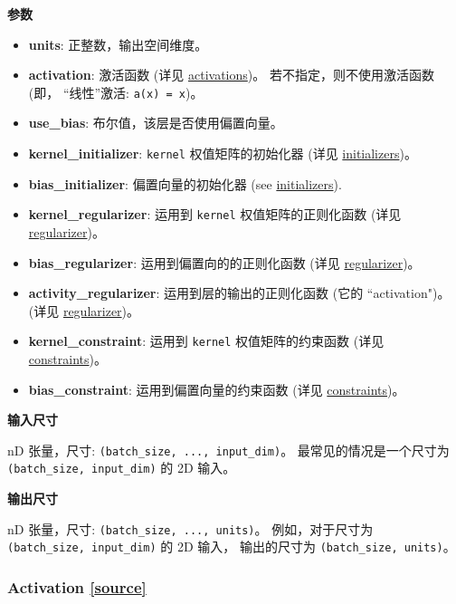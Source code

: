 \textbf{参数}

\begin{itemize}
\tightlist
\item
  \textbf{units}: 正整数，输出空间维度。
\item
  \textbf{activation}: 激活函数 (详见
  \hyperref[activations]{activations})。 若不指定，则不使用激活函数
  (即， ``线性''激活: \texttt{a(x)\ =\ x})。
\item
  \textbf{use\_bias}: 布尔值，该层是否使用偏置向量。
\item
  \textbf{kernel\_initializer}: \texttt{kernel} 权值矩阵的初始化器 (详见
  \hyperref[initializers]{initializers})。
\item
  \textbf{bias\_initializer}: 偏置向量的初始化器 (see
   \hyperref[initializers]{initializers}).
\item
  \textbf{kernel\_regularizer}: 运用到 \texttt{kernel}
  权值矩阵的正则化函数 (详见 \hyperref[regularizers]{regularizer})。
\item
  \textbf{bias\_regularizer}: 运用到偏置向的的正则化函数 (详见
  \hyperref[regularizers]{regularizer})。
\item
  \textbf{activity\_regularizer}: 运用到层的输出的正则化函数 (它的
  ``activation")。 (详见 \hyperref[regularizers]{regularizer})。
\item
  \textbf{kernel\_constraint}: 运用到 \texttt{kernel} 权值矩阵的约束函数
  (详见 \hyperref[constraints]{constraints})。
\item
  \textbf{bias\_constraint}: 运用到偏置向量的约束函数 (详见
  \hyperref[constraints]{constraints})。
\end{itemize}

\textbf{输入尺寸}

nD 张量，尺寸: \texttt{(batch\_size,\ ...,\ input\_dim)}。
最常见的情况是一个尺寸为 \texttt{(batch\_size,\ input\_dim)} 的 2D
输入。

\textbf{输出尺寸}

nD 张量，尺寸: \texttt{(batch\_size,\ ...,\ units)}。 例如，对于尺寸为
\texttt{(batch\_size,\ input\_dim)} 的 2D 输入， 输出的尺寸为
\texttt{(batch\_size,\ units)}。




\subsubsection{Activation {\href{https://github.com/keras-team/keras/blob/master/keras/layers/core.py\#L280}{{[}source{]}}}}


\begin{Shaded}
\begin{Highlighting}[]
\end{Highlighting}
\end{Shaded}

